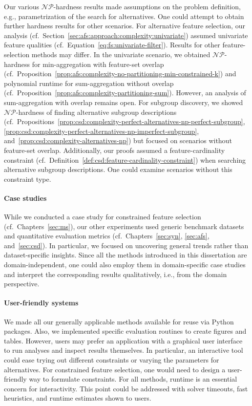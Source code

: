 Our various $\mathcal{NP}$-hardness results made assumptions on the problem definition, e.g., parametrization of the search for alternatives.
One could attempt to obtain further hardness results for other scenarios.
For alternative feature selection, our analysis (cf.~Section~\ref{sec:afs:approach:complexity:univariate}) assumed univariate feature qualities (cf.~Equation~\ref{eq:fs:univariate-filter}).
Results for other feature-selection methods may differ.
In the univariate scenario, we obtained $\mathcal{NP}$-hardness for min-aggregation with feature-set overlap (cf.~Proposition~\ref{prop:afs:complexity-no-partitioning-min-constrained-k}) and polynomial runtime for sum-aggregation without overlap (cf.~Proposition~\ref{prop:afs:complexity-partitioning-sum}).
However, an analysis of sum-aggregation with overlap remains open.
For subgroup discovery, we showed $\mathcal{NP}$-hardness of finding alternative subgroup descriptions (cf.~Propositions~\ref{prop:csd:complexity-perfect-alternatives-np-perfect-subgroup}, \ref{prop:csd:complexity-perfect-alternatives-np-imperfect-subgroup}, and~\ref{prop:csd:complexity-alternatives-np}) but focused on scenarios without feature-set overlap.
Additionally, our proofs assumed a feature-cardinality constraint (cf.~Definition~\ref{def:csd:feature-cardinality-constraint}) when searching alternative subgroup descriptions.
One could examine scenarios without this constraint type.

\paragraph{Case studies}

While we conducted a case study for constrained feature selection (cf.~Chapters~\ref{sec:ms}), our other experiments used generic benchmark datasets and quantitative evaluation metrics (cf.~Chapters~\ref{sec:syn}, \ref{sec:afs}, and~\ref{sec:csd}).
In particular, we focused on uncovering general trends rather than dataset-specific insights.
Since all the methods introduced in this dissertation are domain-independent, one could also employ them in domain-specific case studies and interpret the corresponding results qualitatively, i.e., from the domain perspective.

\paragraph{User-friendly systems}

We made all our generally applicable methods available for reuse via Python packages.
Also, we implemented specific evaluation routines to create figures and tables.
However, users may prefer an application with a graphical user interface to run analyses and inspect results themselves.
In particular, an interactive tool could ease trying out different constraints or varying the parameters for alternatives.
For constrained feature selection, one would need to design a user-friendly way to formulate constraints.
For all methods, runtime is an essential concern for interactivity.
This point could be addressed with solver timeouts, fast heuristics, and runtime estimates shown to users.


